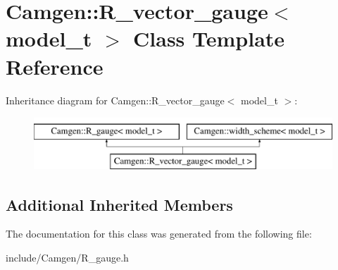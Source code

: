 \hypertarget{a00466}{}\section{Camgen\+:\+:R\+\_\+vector\+\_\+gauge$<$ model\+\_\+t $>$ Class Template Reference}
\label{a00466}
Inheritance diagram for Camgen\+:\+:R\+\_\+vector\+\_\+gauge$<$ model\+\_\+t $>$\+:\begin{figure}[H]
\begin{center}
\leavevmode
\includegraphics[height=2.000000cm]{a00466}
\end{center}
\end{figure}
\subsection*{Additional Inherited Members}


The documentation for this class was generated from the following file\+:\begin{DoxyCompactItemize}
\item 
include/\+Camgen/R\+\_\+gauge.\+h\end{DoxyCompactItemize}
